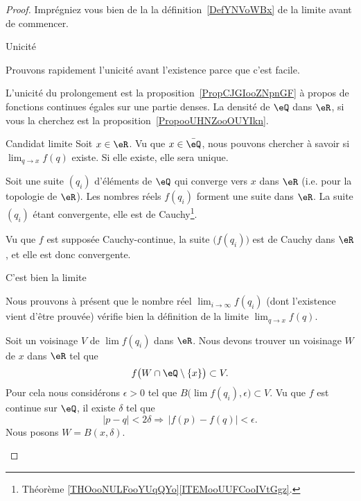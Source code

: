 \begin{proof}
    Imprégniez vous bien de la la définition~\ref{DefYNVoWBx} de la limite avant de commencer.

    \begin{subproof}

    \item[Unicité]

        Prouvons rapidement l'unicité avant l'existence parce que c'est facile.

        L'unicité du prolongement est la proposition~\ref{PropCJGIooZNpnGF} à propos de fonctions continues égales sur une partie denses. La densité de \( \eQ\) dans \( \eR\), si vous la cherchez est la proposition~\ref{PropooUHNZooOUYIkn}.

        \item[Candidat limite]
        Soit \( x\in \eR\). Vu que \( x\in \bar \eQ\), nous pouvons chercher à savoir si \( \lim_{q\to x} f(q) \) existe. Si elle existe, elle sera unique.

        Soit une suite \( (q_i)\) d'éléments de \( \eQ\) qui converge vers \( x\) dans \( \eR\) (i.e. pour la topologie de \( \eR\)). Les nombres réels \( f(q_i)\) forment une suite dans \( \eR\). La suite \( (q_i)\) étant convergente, elle est de Cauchy\footnote{Théorème \ref{THOooNULFooYUqQYo}\ref{ITEMooUUFCooIVtGgz}.}.

        Vu que \( f\) est supposée Cauchy-continue, la suite \(\big( f(q_i) \big)\) est de Cauchy dans \( \eR\), et elle est donc convergente.
    \item[C'est bien la limite]

        Nous prouvons à présent que le nombre réel \( \lim_{i\to \infty} f(q_i)\) (dont l'existence vient d'être prouvée) vérifie bien la définition de la limite \( \lim_{q\to x}f(q)\).

        Soit un voisinage \( V\) de \( \lim f(q_i)\) dans \( \eR\). Nous devons trouver un voisinage \( W\) de \( x\) dans \( \eR\) tel que
        \begin{equation}
            f\big( W\cap\eQ\setminus\{ x \} \big)\subset V.
        \end{equation}
        Pour cela nous considérons \( \epsilon>0\) tel que \( B\big( \lim f(q_i),\epsilon \big)\subset V\). Vu que \( f\) est continue sur \( \eQ\), il existe \( \delta\) tel que
        \begin{equation}
            | p-q |<2\delta\Rightarrow\,| f(p)-f(q) |<\epsilon.
        \end{equation}
        Nous posons \( W=B(x,\delta)\).


\end{subproof}
\end{proof}
